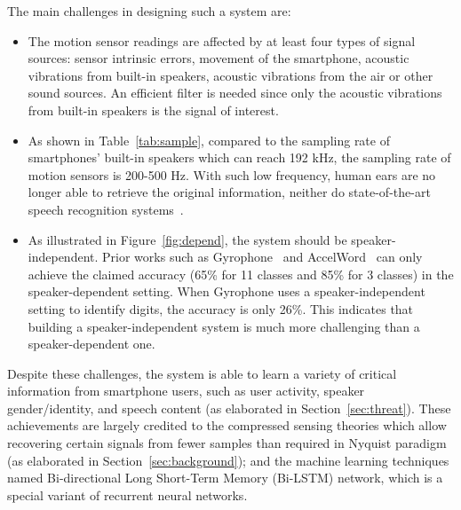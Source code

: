 
The main challenges in designing such a system are:
 \begin{itemize}
 	\item  The motion sensor readings are affected by at least four types of signal sources: sensor intrinsic errors, movement of the smartphone, acoustic vibrations from built-in speakers, acoustic vibrations from the air or other sound sources. An efficient filter is needed since only the acoustic vibrations from built-in speakers is the signal of interest.
 	
 	\item As shown in Table~\ref{tab:sample}, compared to the sampling rate of smartphones' built-in speakers which can reach 192 kHz, the sampling rate of motion sensors is 200-500 Hz. With such low frequency, human ears are no longer able to retrieve the original information, neither do state-of-the-art speech recognition systems~\cite{michalevsky2014gyrophone}.
 	
 	\item As illustrated in Figure~\ref{fig:depend}, the system should be speaker-independent. Prior works such as  Gyrophone~\cite{michalevsky2014gyrophone} and AccelWord~\cite{zhang2015accelword} can only achieve the claimed accuracy (65\% for 11 classes and 85\% for 3 classes) in the speaker-dependent setting. When Gyrophone uses a speaker-independent setting to identify digits, the
 	accuracy is only 26\%. This indicates that building a speaker-independent system is much more challenging than a speaker-dependent one.
 
 \end{itemize}



Despite these challenges, the {\systemName} system is able to learn a variety of critical information from smartphone users, such as user activity, speaker gender/identity, and speech content (as elaborated in Section~\ref{sec:threat}). 
These achievements are largely credited to the compressed sensing theories which allow recovering certain signals from fewer samples than required in Nyquist paradigm (as elaborated in Section~\ref{sec:background}); and the machine learning techniques named Bi-directional Long Short-Term Memory (Bi-LSTM) network, which is a special variant of recurrent neural networks. 




